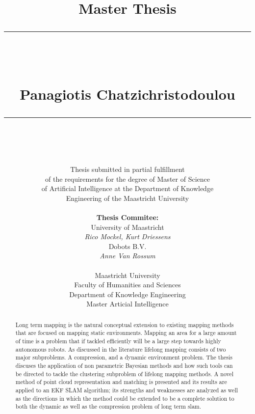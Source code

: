 \documentclass[twoside,hidelinks]{article}
\title{
\Huge{Master Thesis} \\
\noindent\rule{4cm}{0.4pt} \\
\vspace{5mm}
\huge{\selectfont{Towards lifelong mapping in pointclouds}}
\vspace{5mm} \\
\normalsize Panagiotis Chatzichristodoulou \\
\noindent\rule{4cm}{0.4pt} \\
\vspace{5mm}
\fontsize{24pt}{10pt}{Master Thesis DKE 09-16 }} %
\author{
\normalsize Thesis submitted in partial fulfillment\\
\normalsize  of the requirements for the degree of Master of Science \\
\normalsize of Artificial Intelligence at the Department of Knowledge \\
\normalsize  Engineering of the Maastricht University \\
\vspace{5mm} \\
\normalsize \textbf{Thesis Commitee:} \\ 
\normalsize University of Maastricht \\ %
\normalsize \textit{Rico Mockel, Kurt Driessens} \\
\normalsize Dobots B.V.\\
\normalsize \textit{Anne Van Rossum} \\
\vspace{0mm} \\
\normalsize Maastricht University \\
\normalsize Faculty of Humanities and Sciences \\ 
\normalsize Department of Knowledge Engineering \\
\normalsize Master Articial Intelligence \\
}
\begin{document}
\maketitle %

\thispagestyle{fancy} %

\newpage

\begin{abstract}

\noindent Long term mapping is the natural conceptual extension to existing mapping methods that are focused on mapping static environments. Mapping an area for a large amount of time is a problem that if tackled efficiently will be a large step towards highly autonomous robots. As discussed in the literature lifelong mapping consists of two major subproblems. A compression, and a dynamic environment problem. The thesis discuses the application of non parametric Bayesian methods and how such tools can be directed to tackle the clustering subproblem of lifelong mapping methods. A novel method of point cloud representation and matching is presented and its results are applied to an EKF SLAM algorithm; its strengths and weaknesses are analyzed as well as the directions in which the method could be extended to be a complete solution to both the dynamic as well as the compression problem of long term slam.


\end{abstract}

\newpage
\thispagestyle{empty}
 
\tableofcontents

\listoffigures
 
 
\newpage
\end{document}
